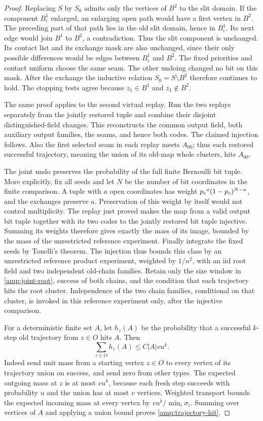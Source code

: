 \begin{proof}
Replacing $S$ by $S_0$ admits only the vertices of $B^2$ to the slit
domain.  If the component $B_i^1$ enlarged, an enlarging open path would
have a first vertex in $B^2$.  The preceding part of that path lies in
the old slit domain, hence in $B_i^1$.  Its next edge would join $B^1$
to $B^2$, a contradiction.  Thus the slit component is unchanged.
Its contact list and its exchange mask are also unchanged, since their
only possible differences would be edges between $B_i^1$ and $B^2$.
The fixed priorities and contact uniform choose the same seam.  The
other undoing changed no bit on this mask.  After the exchange the
inductive relation $S_0=S\setminus B^2$ therefore continues to hold.
The stopping tests agree because $z_1\in B^1$ and $z_1\notin B^2$.

The same proof applies to the second virtual replay.  Run the two
replays separately from the jointly restored tuple and combine their
disjoint distinguished-field changes.  This reconstructs the common
output field, both auxiliary output families, the seams, and hence
both codes.  The claimed injection follows.  Also the first selected
seam in each replay meets $A_{00}$; thus each restored successful
trajectory, meaning the union of its old-map whole clusters, hits
$A_{00}$.

The joint undo preserves the probability of the full finite Bernoulli
bit tuple. More explicitly, fix all seeds and let $N$ be the number
of bit coordinates in the finite comparison. A tuple with $a$ open
coordinates has weight ${p_c}^a(1-{p_c})^{N-a}$, and the exchanges preserve
$a$. Preservation of this weight by itself would not control
multiplicity. The replay just proved makes the map from a valid
output bit tuple together with its two codes to the jointly restored
bit tuple injective. Summing its weights therefore gives exactly
the mass of its image, bounded by the mass of the unrestricted
reference experiment. Finally integrate the fixed seeds by Tonelli's
theorem. The injection thus bounds this class by an unrestricted
reference product experiment, weighted by $1/n^2$, with an iid root
field and two independent old-chain families.  Retain only the size
window in \eqref{amp:joint-root}, success of both chains, and the
condition that each trajectory hits the root cluster.  Independence of
the two chain families, conditional on that cluster, is invoked in this
reference experiment only, after the injective comparison.

For a deterministic finite set $A$, let $h_z(A)$ be the probability that
a successful $k$-step old trajectory from $z\in O$ hits $A$.  Then
\begin{equation}\label{amp:trajectory-hit}
 \sum_{z\in O}h_z(A)\le C|A|v u^k.
\end{equation}
Indeed send unit mass from a starting vertex $z\in O$ to every vertex
of its trajectory union on success, and send zero from other types.
The expected outgoing mass at $z$ is at most $v u^k$, because each
fresh step succeeds with probability $u$ and the union has at most $v$
vertices.  Weighted transport bounds the expected incoming mass at
every vertex by $v u^k/\min_i\sigma_i$.  Summing over vertices of $A$
and applying a union bound proves \eqref{amp:trajectory-hit}.


\end{proof}
